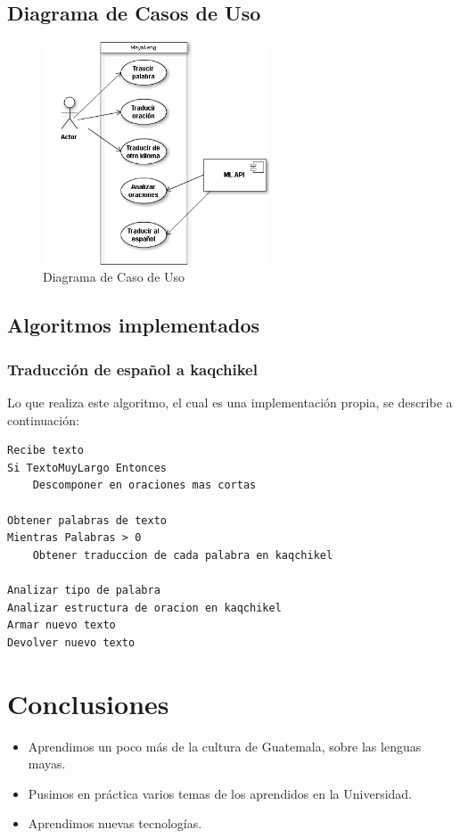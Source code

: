 \documentclass[a4paper,openright,11pt]{article}
\begin{document}
\subsection{Diagrama de Casos de Uso}
\begin{figure}[h]
	\centering
	\includegraphics[width=0.6\textwidth]{casouso}
	\caption{Diagrama de Caso de Uso}
	\label{fig:caso}
\end{figure}
\newpage

\subsection{Algoritmos implementados}
\subsubsection{Traducción de español a kaqchikel}
Lo que realiza este algoritmo, el cual es una implementación propia, se describe a continuación:

\begin{lstlisting}
Recibe texto
Si TextoMuyLargo Entonces
	Descomponer en oraciones mas cortas
	
Obtener palabras de texto
Mientras Palabras > 0
	Obtener traduccion de cada palabra en kaqchikel
	
Analizar tipo de palabra
Analizar estructura de oracion en kaqchikel
Armar nuevo texto
Devolver nuevo texto
\end{lstlisting}
\newpage

\section{Conclusiones}
\begin{itemize}
	\item Aprendimos un poco más de la cultura de Guatemala, sobre las lenguas mayas.
	\item Pusimos en práctica varios temas de los aprendidos en la Universidad.
	\item Aprendimos nuevas tecnologías.
\end{itemize}
\newpage
\end{document}
